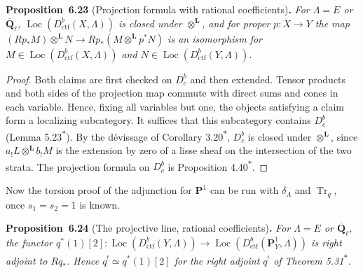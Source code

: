 \documentclass[11pt]{article}
\newenvironment{bpstatement}[2]{\par\addvspace{0.6\baselineskip}\noindent\textbf{#1}#2\textbf{.}\enspace\ignorespaces}
  {\par\addvspace{0.4\baselineskip}}
\newenvironment{bpstatementit}[2]{\begin{bpstatement}{#1}{#2}\itshape\ignorespaces}{\end{bpstatement}}
\newcommand{\bpout}[1]{#1\textsuperscript{\hyperlink{bp-outside}{\ensuremath{\ast}}}}
\providecommand{\Dbc}{}\renewcommand{\Dbc}{D^b_c}
\providecommand{\Loc}{}\renewcommand{\Loc}{\operatorname{Loc}}
\begin{document}
\label{bp72}%
\begin{bpstatementit}{Proposition~6.23}{ (Projection formula with rational coefficients)}
For \(\Lambda=E\) or \(\overline{\mathbf Q}_\ell\), \(\Loc(D^b_{\mathrm{ctf}}(X,\Lambda))\) is closed under \(\otimes^{\mathbf L}\), and for proper \(p:X\to Y\) the map \((Rp_*M)\otimes^{\mathbf L}N\to Rp_*(M\otimes^{\mathbf L}p^*N)\) is an isomorphism for \(M\in\Loc(D^b_{\mathrm{ctf}}(X,\Lambda))\) and \(N\in\Loc(D^b_{\mathrm{ctf}}(Y,\Lambda))\).
\end{bpstatementit}

\begin{proof}[{Proof}]\label{bp73}%
Both claims are first checked on \(\Dbc\) and then extended. Tensor products and both sides of the projection map commute with direct sums and cones in each variable. Hence, fixing all variables but one, the objects satisfying a claim form a localizing subcategory. It suffices that this subcategory contains \(\Dbc\) (Lemma \bpout{5.23}). By the dévissage of Corollary \bpout{3.20}, \(\Dbc\) is closed under \(\otimes^{\mathbf L}\), since \(a_!L\otimes^{\mathbf L}b_!M\) is the extension by zero of a lisse sheaf on the intersection of the two strata. The projection formula on \(\Dbc\) is Proposition \bpout{4.40}.
\end{proof}

\label{bp74}%
Now the torsion proof of the adjunction for \(\mathbf P^1\) can be run with \(\delta_\Lambda\) and \(\operatorname{Tr}_q\), once \(s_1=s_2=1\) is known.

\label{bp75}%
\begin{bpstatementit}{Proposition~6.24}{ (The projective line, rational coefficients)}
For \(\Lambda=E\) or \(\overline{\mathbf Q}_\ell\), the functor \(q^*(1)[2]:\Loc(D^b_{\mathrm{ctf}}(Y,\Lambda))\to\Loc(D^b_{\mathrm{ctf}}(\mathbf P^1_Y,\Lambda))\) is right adjoint to \(Rq_*\). Hence \(q^!\simeq q^*(1)[2]\) for the right adjoint \(q^!\) of Theorem \bpout{5.31}.
\end{bpstatementit}
\end{document}
